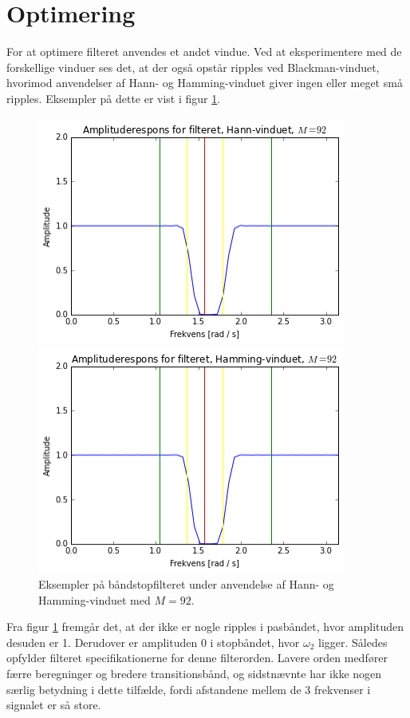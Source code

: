 \section{Optimering}
For at optimere filteret anvendes et andet vindue. Ved at eksperimentere med de forskellige vinduer ses det, at der også opstår ripples ved Blackman-vinduet, hvorimod anvendelser af Hann- og Hamming-vinduet giver ingen eller meget små ripples. Eksempler på dette er vist i figur \ref{fig:filter_Hann_Hamming}.
\begin{figure}[H]
\begin{minipage}{0.49\textwidth}
\includegraphics[width=0.9\textwidth]{figures/Filter_Hann_92.PNG}
\end{minipage}
\begin{minipage}{0.49\textwidth}
\includegraphics[width=0.9\textwidth]{figures/Filter_Hamming_92.PNG}
\end{minipage}
\caption{Eksempler på båndstopfilteret under anvendelse af Hann- og Hamming-vinduet med $M=92$.}
\label{fig:filter_Hann_Hamming}
\end{figure}

Fra figur \ref{fig:filter_Hann_Hamming} fremgår det, at der ikke er nogle ripples i pasbåndet, hvor amplituden desuden er 1. Derudover er amplituden 0 i stopbåndet, hvor $\omega_2$ ligger. Således opfylder filteret specifikationerne for denne filterorden. Lavere orden medfører færre beregninger og bredere transitionsbånd, og sidstnævnte har ikke nogen særlig betydning i dette tilfælde, fordi afstandene mellem de 3 frekvenser i signalet er så store.
